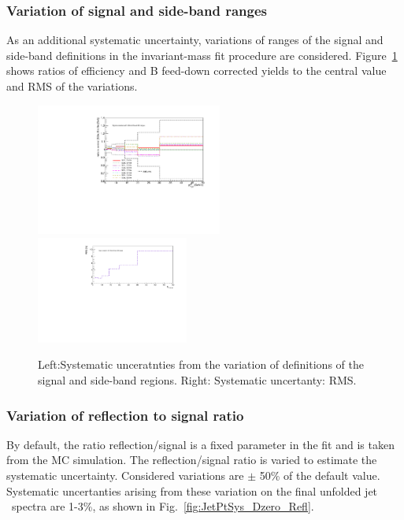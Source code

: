 \subsubsection{Variation of signal and side-band ranges}

As an additional systematic uncertainty, variations of ranges of the signal and side-band definitions in the invariant-mass fit procedure are considered.
Figure~\ref{fig:JetPtSys_Dzero_SBvariaton} shows ratios of efficiency and B feed-down corrected yields to the central value and RMS of the variations.

\begin{figure}[bth]
\begin{center}
\includegraphics[width=0.545\textwidth]{pPbcuts_2sig/rawyield/SBRangesComparison_ratio}
\includegraphics[width=0.445\textwidth]{pPbcuts_2sig/rawyield/SBRangesComparison_rms}
\caption{Left:Systematic unceratnties from the variation of definitions of the signal and side-band regions. Right: Systematic uncertanty: RMS.} 
\label{fig:JetPtSys_Dzero_SBvariaton}
\end{center}
\end{figure}


\subsubsection{Variation of reflection to signal ratio}

By default, the ratio reflection/signal is a fixed parameter in the fit and is taken from the MC simulation. The reflection/signal ratio is varied to estimate the
systematic uncertainty. Considered variations are $\pm$ 50\% of the default value. Systematic uncertanties arising from these variation on the final unfolded jet \pt\ spectra are 1-3\%, as shown in Fig.~\ref{fig:JetPtSys_Dzero_Refl}.

